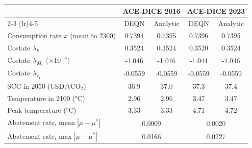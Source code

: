 \begin{tabular}{lcccc}
\toprule
 & \multicolumn{2}{c}{ACE-DICE 2016} & \multicolumn{2}{c}{ACE-DICE 2023} \\
\cmidrule(lr){2-3} \cmidrule(lr){4-5}
 & DEQN & Analytic & DEQN & Analytic \\
\midrule
Consumption rate $x$ (mean to 2300) & 0.7394 & 0.7395 & 0.7396 & 0.7395 \\
Costate $\lambda_k$ & 0.3524 & 0.3524 & 0.3520 & 0.3524 \\
Costate $\lambda_{M_1}$ ($\times 10^{-4}$) & -1.046 & -1.046 & -1.044 & -1.046 \\
Costate $\lambda_{\tau_1}$ & -0.0559 & -0.0559 & -0.0559 & -0.0559 \\
SCC in 2050 (USD/tCO$_2$) & 36.9 & 37.0 & 37.3 & 37.4 \\
Temperature in 2100 (°C) & 2.96 & 2.96 & 3.47 & 3.47 \\
Peak temperature (°C) & 3.33 & 3.33 & 4.71 & 4.72 \\
\midrule
Abatement rate, mean $|\mu - \mu^*|$ & \multicolumn{2}{c}{0.0009} & \multicolumn{2}{c}{0.0020} \\
Abatement rate, max $|\mu - \mu^*|$ & \multicolumn{2}{c}{0.0166} & \multicolumn{2}{c}{0.0227} \\
\bottomrule
\end{tabular}
